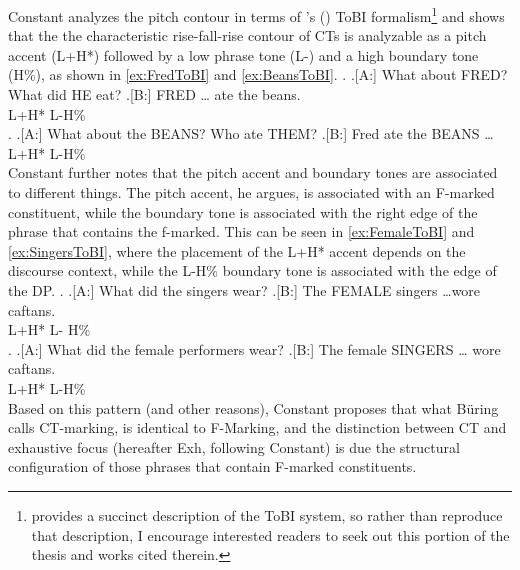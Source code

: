 \documentclass[
	letterpaper,
]{article}
\begin{document}
Constant analyzes the pitch contour in terms of \citeauthor{pierrehumbert1990meaning}'s (\citeyear{pierrehumbert1990meaning}) ToBI formalism\footnote{\textcite[14--16]{constant2014diss} provides a succinct description of the ToBI system, so rather than reproduce that description, I encourage interested readers to seek out this portion of the thesis and works cited therein.} and shows that the the characteristic rise-fall-rise contour of CTs is analyzable as a pitch accent (L+H*) followed by a low phrase tone (L-) and a high boundary tone (H\%), as shown in \ref{ex:FredToBI} and \ref{ex:BeansToBI}.
\ex.\label{ex:FredToBI}
\a.[A:] What about FRED? What did HE eat?
\bg.[B:] FRED {\ldots} {ate the beans.}\\
L+H* L-H\% {}\\

\ex.\label{ex:BeansToBI}
\a.[A:] What about the BEANS? Who ate THEM?
\bg.[B:] {Fred ate the} BEANS \ldots\\
{} L+H* L-H\%\\

Constant further notes that the pitch accent and boundary tones are associated to different things.
The pitch accent, he argues, is associated with an F-marked constituent, while the boundary tone is associated with the right edge of the phrase that contains the f-marked.
This can be seen in \ref{ex:FemaleToBI} and \ref{ex:SingersToBI}, where the placement of the L+H* accent depends on the discourse context, while the L-H\% boundary tone is associated with the edge of the DP.
\ex.\label{ex:FemaleToBI}
\a.[A:] What did the singers wear?
\bg.[B:] The {\hspace{1em}FEMALE} singers \ldots {wore caftans.}\\
{} L+H* {\hspace{2em}L-} H\% {}\\

\ex.\label{ex:SingersToBI}
\a.[A:] What did the female performers wear?
\bg.[B:] {The female} {\hspace{1em}SINGERS} {\hspace{1em}\ldots} {wore caftans.}\\
{} L+H* L-H\% {}\\

Based on this pattern (and other reasons), Constant proposes that what B\"uring calls CT-marking, is identical to F-Marking, and the distinction between CT and exhaustive focus (hereafter Exh, following Constant) is due the structural configuration of those phrases that contain F-marked constituents.
\end{document}

